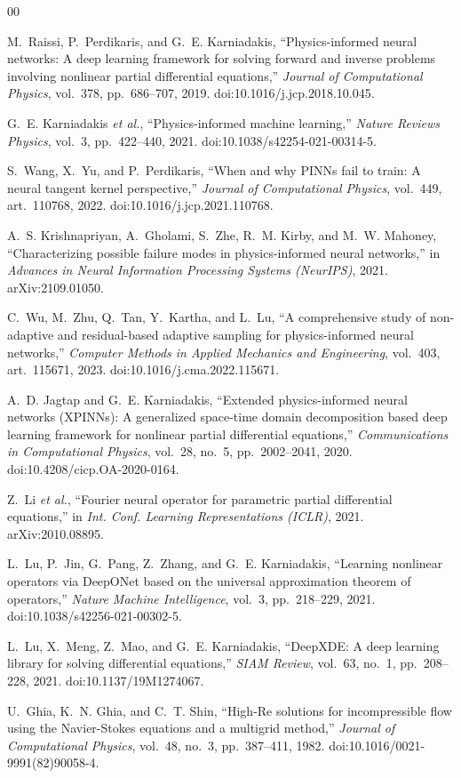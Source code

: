 \documentclass[journal]{IEEEtran}
\begin{document}
\begin{thebibliography}{00}

 M.~Raissi, P.~Perdikaris, and G.~E. Karniadakis, ``Physics-informed neural networks: A deep
learning framework for solving forward and inverse problems involving nonlinear partial differential equations,''
\emph{Journal of Computational Physics}, vol.~378, pp.~686--707, 2019. doi:10.1016/j.jcp.2018.10.045.

 G.~E. Karniadakis \emph{et al.}, ``Physics-informed machine learning,'' \emph{Nature
Reviews Physics}, vol.~3, pp.~422--440, 2021. doi:10.1038/s42254-021-00314-5.

 S.~Wang, X.~Yu, and P.~Perdikaris, ``When and why PINNs fail to train: A neural tangent kernel
perspective,'' \emph{Journal of Computational Physics}, vol.~449, art.~110768, 2022.
doi:10.1016/j.jcp.2021.110768.

 A.~S. Krishnapriyan, A.~Gholami, S.~Zhe, R.~M. Kirby, and M.~W. Mahoney, ``Characterizing
possible failure modes in physics-informed neural networks,'' in \emph{Advances in Neural Information Processing
Systems (NeurIPS)}, 2021. arXiv:2109.01050.

 C.~Wu, M.~Zhu, Q.~Tan, Y.~Kartha, and L.~Lu, ``A comprehensive study of non-adaptive and
residual-based adaptive sampling for physics-informed neural networks,'' \emph{Computer Methods in Applied
Mechanics and Engineering}, vol.~403, art.~115671, 2023. doi:10.1016/j.cma.2022.115671.

 A.~D. Jagtap and G.~E. Karniadakis, ``Extended physics-informed neural networks (XPINNs): A
generalized space-time domain decomposition based deep learning framework for nonlinear partial differential
equations,'' \emph{Communications in Computational Physics}, vol.~28, no.~5, pp.~2002--2041, 2020.
doi:10.4208/cicp.OA-2020-0164.

 Z.~Li \emph{et al.}, ``Fourier neural operator for parametric partial differential equations,'' in
\emph{Int. Conf. Learning Representations (ICLR)}, 2021. arXiv:2010.08895.

 L.~Lu, P.~Jin, G.~Pang, Z.~Zhang, and G.~E. Karniadakis, ``Learning nonlinear operators via
DeepONet based on the universal approximation theorem of operators,'' \emph{Nature Machine Intelligence}, vol.~3,
pp.~218--229, 2021. doi:10.1038/s42256-021-00302-5.

 L.~Lu, X.~Meng, Z.~Mao, and G.~E. Karniadakis, ``DeepXDE: A deep learning library for solving
differential equations,'' \emph{SIAM Review}, vol.~63, no.~1, pp.~208--228, 2021. doi:10.1137/19M1274067.

 U.~Ghia, K.~N. Ghia, and C.~T. Shin, ``High-Re solutions for incompressible flow using the
Navier-Stokes equations and a multigrid method,'' \emph{Journal of Computational Physics}, vol.~48, no.~3,
pp.~387--411, 1982. doi:10.1016/0021-9991(82)90058-4.

\end{thebibliography}
\end{document}
